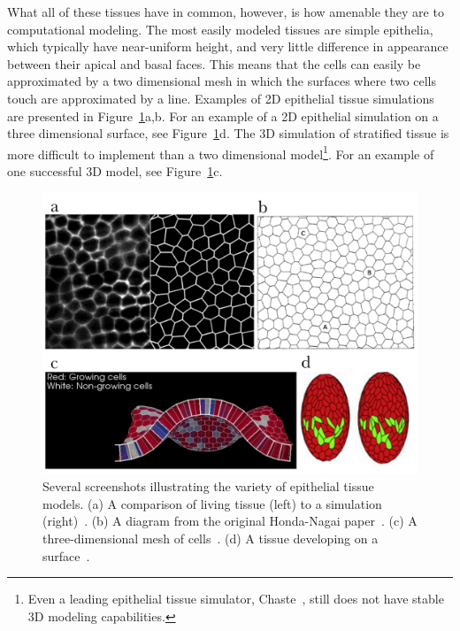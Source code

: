 What all of these tissues have in common, however, is how amenable they are to computational modeling. The most easily modeled tissues are simple epithelia, which typically have near-uniform height, and very little difference in appearance between their apical and basal faces. This means that the cells can easily be approximated by a two dimensional mesh in which the surfaces where two cells touch are approximated by a line. Examples of 2D epithelial tissue simulations are presented in Figure~\ref{fig:fourgraphs}a,b. For an example of a 2D epithelial simulation on a three dimensional surface, see Figure~\ref{fig:fourgraphs}d. The 3D simulation of stratified tissue is more difficult to implement than a two dimensional model\footnote{Even a leading epithelial tissue simulator, Chaste~\cite{ChasteMain}, still does not have stable 3D modeling capabilities.}. For an example of one successful 3D model, see Figure~\ref{fig:fourgraphs}c.

\begin{figure}[h]
    \centering
    \includegraphics[width=\textwidth]{../diagrams/abcd3.pdf}
    \caption[Various Models of Epithelial Tissue]{Several screenshots illustrating the variety of epithelial tissue models. (a) A comparison of living tissue (left) to a simulation (right)~\cite{Yoshi}. (b) A diagram from the original Honda-Nagai paper~\cite{HondaNagai}. (c) A three-dimensional mesh of cells~\cite{Okuda1}. (d) A tissue developing on a surface~\cite{VertexModels}.}
    \label{fig:fourgraphs}
\end{figure}

